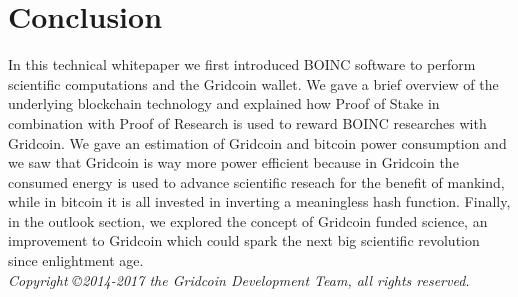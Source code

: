 \section{Conclusion}

In this technical whitepaper we first introduced BOINC software to perform scientific computations and the Gridcoin wallet. We gave a brief overview of the underlying blockchain technology and explained how Proof of Stake in combination with Proof of Research is used to reward BOINC researches with Gridcoin. We gave an estimation of Gridcoin and bitcoin power consumption and we saw that Gridcoin is way more power efficient because in Gridcoin the consumed energy is used to advance scientific reseach for the benefit of mankind, while in bitcoin it is all invested in inverting a meaningless hash function. Finally, in the outlook section, we explored the concept of Gridcoin funded science, an improvement to Gridcoin which could spark the next big scientific revolution since enlightment age.\\

\textit{Copyright \copyright  2014-2017 the Gridcoin Development Team, all rights reserved.}

